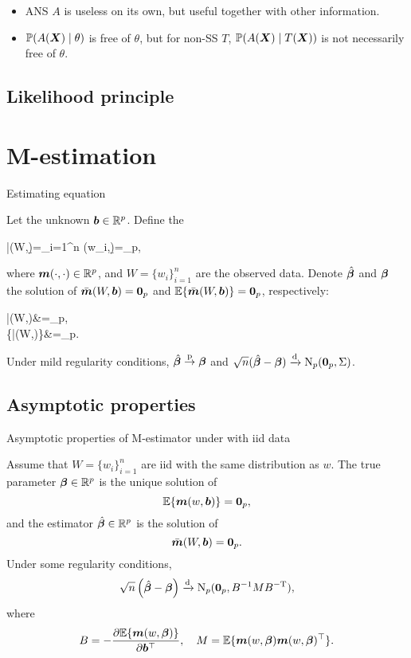 \documentclass[10pt,a4paper]{book}
\begin{document}
\begin{remark}\label{rmk:SS-MSS-ANS-CS}
	\begin{itemize}
		\item ANS $A$ is useless on its own, but useful together with other information. 
		\item $\mathbb P(A({\boldsymbol X})\mid \theta)$ is free of $\theta$, but for non-SS $T$, $\mathbb P(A({\boldsymbol X})\mid T({\boldsymbol X}))$ is not necessarily free of $\theta$. 
	\end{itemize}
\end{remark}

\subsection{Likelihood principle}\label{sec:prin-data-reduce-lik}

\section{M-estimation}\label{sec:M_est}

\begin{defbox}{Estimating equation}
	\begin{definition}\label{def:est_eq}
		Let the unknown ${\boldsymbol b}\in\mathbb R^p$. Define the 
		\begin{sequation}\label{eq:est_eq}
			\bar{\m}(W,\b)=\sum_{i=1}^n \m(w_i,\b)=\0_p,
		\end{sequation}
		where ${\boldsymbol m}(\cdot,\cdot)\in\mathbb R^p$, and $W=\{w_i\}_{i=1}^n$ are the observed data. Denote $\hat{{\boldsymbol\beta}}$ and ${\boldsymbol\beta}$ the solution of $\bar{{\boldsymbol m}}(W,{\boldsymbol b})={\boldsymbol 0}_p$ and $\mathbb E\{\bar{{\boldsymbol m}}(W,{\boldsymbol b})\}={\boldsymbol 0}_p$, respectively:
		\begin{salign*}
			\bar{\m}(W,\hat{\bab})&=\0_p,\\
			\bbE\{\bar{\m}(W,\bab)\}&=\0_p.
		\end{salign*}  
	\end{definition}
\end{defbox}
Under mild regularity conditions, $\hat{{\boldsymbol\beta}}\stackrel{\mathrm{p}}{\to}{\boldsymbol\beta}$ and $\sqrt{n}(\hat{{\boldsymbol\beta}}-{\boldsymbol\beta})\xrightarrow{\mathrm{d}}\mathrm{N}_p({\boldsymbol 0}_p,\Sigma)$.  

\subsection{Asymptotic properties}\label{sec:M_est_asym}
\begin{thmbox}{Asymptotic properties of M-estimator under with iid data}
	\begin{theorem}\label{thm:M_est_asym_iid}
		Assume that $W=\{w_i\}_{i=1}^{n}$ are iid with the same distribution as $w$. The true parameter ${\boldsymbol\beta}\in\mathbb{R}^p$ is the unique solution of
		$$\mathbb E\{{\boldsymbol m}(w,{\boldsymbol b})\}={\boldsymbol 0}_p,$$
		and the estimator $\hat{{\boldsymbol\beta}}\in\mathbb{R}^p$ is the solution of
		$$
		\bar{{\boldsymbol m}}(W,{\boldsymbol b})={\boldsymbol 0}_p.$$
		Under some regularity conditions,
		$$\sqrt{n}\left(\hat{{\boldsymbol\beta}}-{\boldsymbol\beta}\right)\xrightarrow{\mathrm{d}} \mathrm{N}_p({\boldsymbol 0}_p,B^{-1}MB^{-\mathrm{T}}),$$
		where
		$$
		B=-\frac{\partial \mathbb E\{{\boldsymbol m}(w,{\boldsymbol\beta})\}}{\partial {\boldsymbol b}^\top},\quad M=\mathbb E\{{\boldsymbol m}(w,{\boldsymbol\beta}){\boldsymbol m}(w,{\boldsymbol\beta})^\top\}.$$
	\end{theorem}
\end{thmbox}
\end{document}
